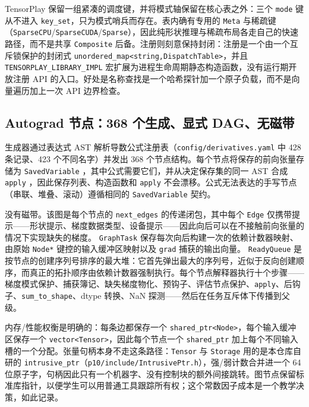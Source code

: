 TensorPlay 保留一组紧凑的调度键，并将模式轴保留在核心表之外：三个 \texttt{mode} 键从不进入 \texttt{key\_set}，只为模式哨兵而存在。表内确有专用的 \texttt{Meta} 与稀疏键（\texttt{SparseCPU}/\texttt{SparseCUDA}/\texttt{Sparse}），因此纯形状推理与稀疏布局各走自己的快速路径，而不是共享 \texttt{Composite} 后备。注册则刻意保持封闭：注册是一个由一个互斥锁保护的封闭式 \texttt{unordered\_map<string,DispatchTable>}，并且 \texttt{TENSORPLAY\_LIBRARY\_IMPL} 宏扩展为进程生命周期静态构造函数，没有运行期开放注册 API 的入口。好处是名称查找是一个哈希探针加一个原子负载，而不是向量遍历加上一次 API 边界检查。

\subsection{Autograd 节点：368 个生成、显式 DAG、无磁带}
\label{subsec:eval-autograd-nodes}

生成器通过表达式 AST 解析导数公式注册表（\texttt{config/derivatives.yaml} 中 428 条记录、423 个不同名字）并发出 368 个节点结构。每个节点将保存的前向张量存储为 \texttt{SavedVariable} ，其中公式需要它们，并从决定保存集的同一 AST 合成 \texttt{apply} ，因此保存列表、构造函数和 \texttt{apply} 不会漂移。公式无法表达的手写节点（串联、堆叠、滚动）遵循相同的 \texttt{SavedVariable} 契约。

没有磁带。该图是每个节点的 \texttt{next\_edges} 的传递闭包，其中每个 \texttt{Edge} 仅携带提示——形状提示、梯度数据类型、设备提示——因此向后可以在不接触前向张量的情况下实现缺失的梯度。 \texttt{GraphTask} 保存每次向后构建一次的依赖计数器映射、由原始 \texttt{Node*} 键控的输入缓冲区映射以及 \texttt{grad} 捕获的输出向量。 \texttt{ReadyQueue} 是按节点的创建序列号排序的最大堆：它首先弹出最大的序列号，近似于反向创建顺序，而真正的拓扑顺序由依赖计数器强制执行。每个节点解释器执行十个步骤——梯度模式保护、捕获簿记、缺失梯度物化、预钩子、评估节点保护、\texttt{apply}、后钩子、\texttt{sum\_to\_shape}、dtype 转换、NaN 探测——然后在任务互斥体下传播到父级。

内存/性能权衡是明确的：每条边都保存一个 \texttt{shared\_ptr<Node>}，每个输入缓冲区保存一个 \texttt{vector<Tensor>}，因此每个节点一个 \texttt{shared\_ptr} 加上每个不同输入槽的一个分配。张量句柄本身不走这条路径：\texttt{Tensor} 与 \texttt{Storage} 用的是本仓库自研的 \texttt{intrusive\_ptr}（\texttt{p10/include/IntrusivePtr.h}），强/弱计数合并进一个 64 位原子字，句柄因此只有一个机器字、没有控制块的额外间接跳转。图节点保留标准库指针，以便学生可以用普通工具跟踪所有权；这个常数因子成本是一个教学决策，如此记录。


